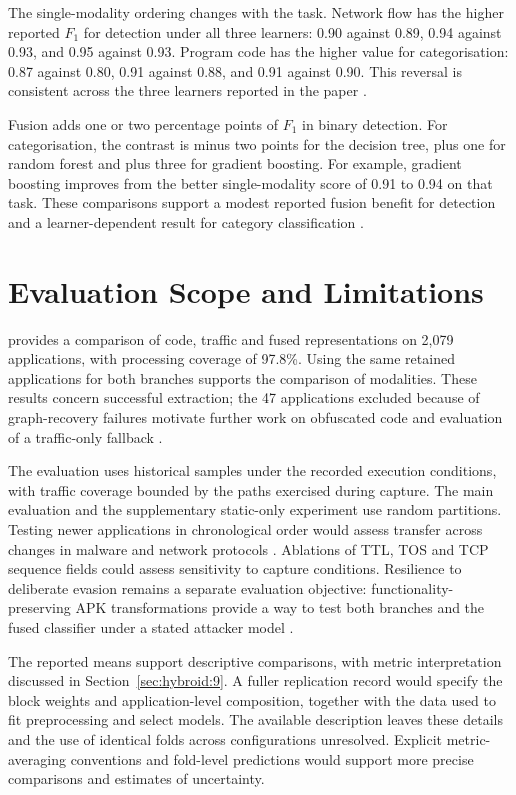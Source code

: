 The single-modality ordering changes with the task. Network flow has the higher reported $F_1$
for detection under all three learners: 0.90 against 0.89, 0.94 against 0.93, and 0.95 against
0.93. Program code has the higher value for categorisation: 0.87 against 0.80, 0.91 against 0.88,
and 0.91 against 0.90. This reversal is consistent across the three learners reported in the
paper \cite{norouzian2021hybroid}.

Fusion adds one or two percentage points of $F_1$ in binary detection. For categorisation,
the contrast is minus two points for the decision tree, plus one for random forest and plus
three for gradient boosting. For example, gradient boosting improves from the better
single-modality score of 0.91 to 0.94 on that task. These comparisons support a modest reported
fusion benefit for detection and a learner-dependent result for category classification
\cite{norouzian2021hybroid}.

\section{Evaluation Scope and Limitations}
\label{sec:hybroid:12}

\hybroid{} provides a comparison of code, traffic and fused representations on 2,079 applications,
with processing coverage of 97.8\%. Using the same retained applications for both branches
supports the comparison of modalities. These results concern successful extraction; the
47 applications excluded because of graph-recovery failures motivate further work on
obfuscated code and evaluation of a traffic-only fallback \cite{norouzian2021hybroid}.

The evaluation uses historical samples under the recorded execution conditions, with traffic
coverage bounded by the paths exercised during capture. The main evaluation and the supplementary
static-only experiment use random partitions.
Testing newer applications in chronological order would assess transfer across changes in malware
and network protocols \cite{pendlebury2019tesseract}. Ablations of TTL, TOS and TCP sequence
fields could assess sensitivity to capture conditions. Resilience to deliberate evasion remains
a separate evaluation objective: functionality-preserving APK transformations provide a way
to test both branches and the fused classifier under a stated attacker model
\cite{song2026fcghunter, li2025efficient}.

The reported means support descriptive comparisons, with metric interpretation discussed in
Section~\ref{sec:hybroid:9}. A fuller replication record would specify the block weights and
application-level composition, together with the data used to fit preprocessing and select
models. The available description leaves these details and the use of identical folds across
configurations unresolved. Explicit metric-averaging conventions and fold-level predictions
would support more precise comparisons and estimates of uncertainty.

